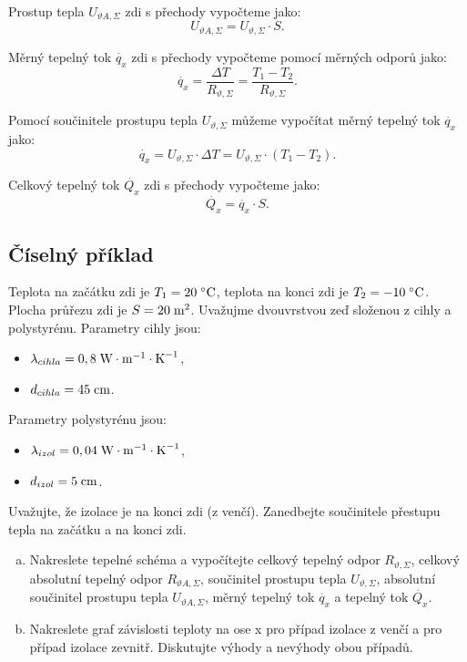 \documentclass{article}
\begin{document}
Prostup tepla $U_{\vartheta A,\Sigma}$ zdi s přechody vypočteme jako:
$$
    U_{\vartheta A,\Sigma} = U_{\vartheta,\Sigma} \cdot S.
$$

Měrný tepelný tok $\dot{q_x}$ zdi s přechody vypočteme pomocí měrných odporů jako:
$$
    \dot{q_x} = \frac{\Delta T}{R_{\vartheta,\Sigma}} = \frac{T_1 - T_2}{R_{\vartheta,\Sigma}}.
$$

Pomocí součinitele prostupu tepla $U_{\vartheta,\Sigma}$ můžeme vypočítat měrný tepelný tok $\dot{q_x}$ jako:
$$
    \dot{q_x} = U_{\vartheta,\Sigma} \cdot \Delta T = U_{\vartheta,\Sigma} \cdot (T_1 - T_2).
$$

Celkový tepelný tok $\dot{Q_x}$ zdi s přechody vypočteme jako:
$$
    \dot{Q_x} = \dot{q_x} \cdot S.
$$


\subsection{Číselný příklad}
Teplota na začátku zdi je $T_1 = 20 \; ^\circ \textrm{C}$, teplota na konci zdi je $T_2 = -10 \; ^\circ \textrm{C}$. Plocha průřezu zdi je $S = 20 \; \textrm{m}^{\textrm{2}}$. Uvažujme dvouvrstvou zeď složenou z cihly a polystyrénu. Parametry cihly jsou:
\begin{itemize}
    \item $\lambda_{cihla} = 0,8 \; \textrm{W} \cdot \textrm{m}^{-1} \cdot \textrm{K}^{-1}$,
    \item $d_{cihla} = 45 \; \textrm{cm}$.
\end{itemize}

Parametry polystyrénu jsou:
\begin{itemize}
    \item $\lambda_{izol} = 0,04 \; \textrm{W} \cdot \textrm{m}^{-1} \cdot \textrm{K}^{-1}$,
    \item $d_{izol} = 5 \; \textrm{cm}$.
\end{itemize}

Uvažujte, že izolace je na konci zdi (z venčí). Zanedbejte součinitele přestupu tepla na začátku a na konci zdi.

\begin{enumerate}[a)]
    \item Nakreslete tepelné schéma a vypočítejte celkový tepelný odpor $R_{\vartheta,\Sigma}$, celkový absolutní tepelný odpor $R_{\vartheta A,\Sigma}$, součinitel prostupu tepla $U_{\vartheta,\Sigma}$, absolutní součinitel prostupu tepla $U_{\vartheta A,\Sigma}$, měrný tepelný tok $\dot{q_x}$ a tepelný tok $\dot{Q_x}$.
    \item Nakreslete graf závislosti teploty na ose x pro případ izolace z venčí a pro případ izolace zevnitř. Diskutujte výhody a nevýhody obou případů.
\end{enumerate}
\end{document}
